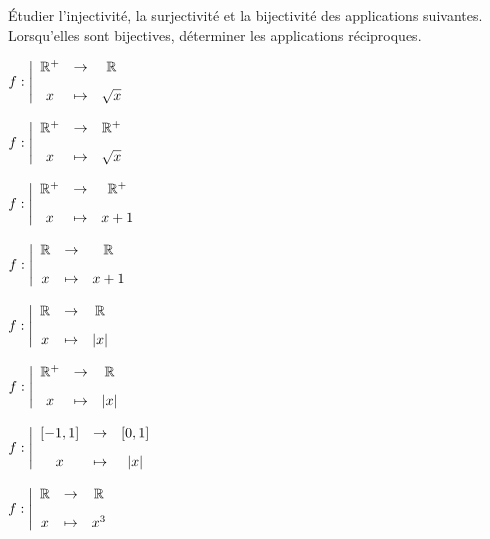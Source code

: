 \documentclass[a4paper, 11pt,reqno]{article}
\begin{document}
\begin{exercice}  \;
	\'Etudier l'injectivit\'e, la surjectivit\'e et la bijectivit\'e des applications suivantes. Lorsqu'elles sont bijectives, d\'eterminer les applications r\'eciproques.
	\begin{enumerate}
		\begin{minipage}[t]{0.3\textwidth}
			\item $f:\left|\begin{array}{ccc} \R^+&\rightarrow& \R\vsec\\ x & \mapsto & \sqrt{x}\end{array}\right.$
			\item $f:\left|\begin{array}{ccc} \R^+&\rightarrow& \R^+\vsec\\ x & \mapsto & \sqrt{x}\end{array}\right.$
			\item $f:\left|\begin{array}{ccc} \R^+&\rightarrow& \R^+\vsec\\ x & \mapsto & x+1\end{array}\right.$
			\item $f:\left|\begin{array}{ccc} \R&\rightarrow& \R\vsec\\ x & \mapsto & x+1\end{array}\right.$
			\item $f:\left|\begin{array}{ccc} \R&\rightarrow& \R\vsec\\ x & \mapsto & |x|\end{array}\right.$
			\item $f:\left|\begin{array}{ccc} \R^+&\rightarrow& \R\vsec\\ x & \mapsto & |x|\end{array}\right.$
		\end{minipage}
		\begin{minipage}[t]{0.3\textwidth}
			\item $f:\left|\begin{array}{ccc} \lbrack -1,1\rbrack &\rightarrow& \lbrack 0,1\rbrack\vsec\\ x & \mapsto & |x|\end{array}\right.$
			\item $f:\left|\begin{array}{ccc} \R&\rightarrow& \R\vsec\\ x & \mapsto & x^3\end{array}\right.$

\end{minipage}
\end{enumerate}
\end{exercice}
\end{document}
